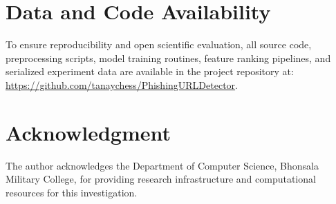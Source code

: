 \documentclass[a4paper,conference]{IEEEtran}
\begin{document}








\section*{Data and Code Availability}
To ensure reproducibility and open scientific evaluation, all source code, preprocessing scripts, model training routines, feature ranking pipelines, and serialized experiment data are available in the project repository at: \url{https://github.com/tanaychess/PhishingURLDetector}.

\section*{Acknowledgment}
The author acknowledges the Department of Computer Science, Bhonsala Military College, for providing research infrastructure and computational resources for this investigation.

\balance


\end{document}
